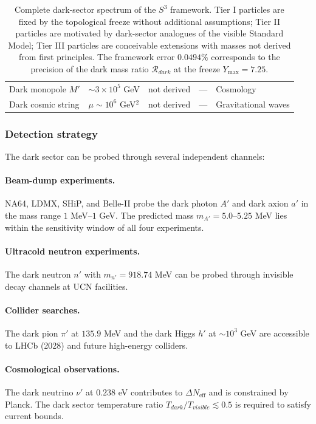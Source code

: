 \documentclass[a4paper,1pt,oneside,openany]{book}
\begin{document}
\begin{table}[htbp]
\begin{tabular}{@{}p{}p{}p{}p{}p{}@{}}
Dark monopole $M'$ & $\sim 3\times 10^{5}$ GeV & not derived & --- & Cosmology \\
Dark cosmic string & $\mu\sim 10^{6}$ GeV$^{2}$ & not derived & --- & Gravitational waves \\
\bottomrule
\end{tabular}
\caption{Complete dark-sector spectrum of the $S^{3}$ framework. 
Tier I particles are fixed by the topological freeze without 
additional assumptions; Tier II particles are motivated by 
dark-sector analogues of the visible Standard Model; Tier III 
particles are conceivable extensions with masses not derived 
from first principles. The framework error $0.0494\%$ corresponds 
to the precision of the dark mass ratio $\mathcal{R}_{dark}$ at 
the freeze $Y_{\max}=7.25$.}
\label{tab:dark-spectrum}
\end{table}

\subsubsection{Detection strategy}

The dark sector can be probed through several independent 
channels:

\paragraph{Beam-dump experiments.}
NA64, LDMX, SHiP, and Belle-II probe the dark photon $A'$ and 
dark axion $a'$ in the mass range $1$ MeV--$1$ GeV. The 
predicted mass $m_{A'}=5.0$--$5.25$ MeV lies within the 
sensitivity window of all four experiments.

\paragraph{Ultracold neutron experiments.}
The dark neutron $n'$ with $m_{n'}=918.74$ MeV can be probed 
through invisible decay channels at UCN facilities.

\paragraph{Collider searches.}
The dark pion $\pi'$ at $135.9$ MeV and the dark Higgs $h'$ at 
$\sim 10^{3}$ GeV are accessible to LHCb (2028) and future 
high-energy colliders.

\paragraph{Cosmological observations.}
The dark neutrino $\nu'$ at $0.238$ eV contributes to 
$\Delta N_{\text{eff}}$ and is constrained by Planck. The dark 
sector temperature ratio $T_{dark}/T_{visible}\lesssim 0.5$ is 
required to satisfy current bounds.
\end{document}
